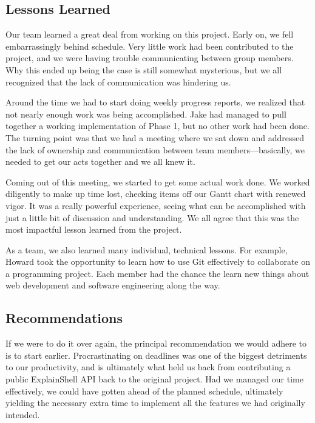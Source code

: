 \documentclass[11pt]{article}
\begin{document}
\subsection{Lessons Learned}

Our team learned a great deal from working on this project. Early on, we fell
embarrassingly behind schedule. Very little work had been contributed to the
project, and we were having trouble communicating between group members. Why
this ended up being the case is still somewhat mysterious, but we all recognized
that the lack of communication was hindering us.

Around the time we had to start doing weekly progress reports, we realized that
not nearly enough work was being accomplished. Jake had managed to pull together
a working implementation of Phase 1, but no other work had been done. The
turning point was that we had a meeting where we sat down and addressed the
lack of ownership and communication between team members---basically, we needed
to get our acts together and we all knew it.

Coming out of this meeting, we started to get some actual work done. We worked
diligently to make up time lost, checking items off our Gantt chart with renewed
vigor. It was a really powerful experience, seeing what can be accomplished with
just a little bit of discussion and understanding. We all agree that this was
the most impactful lesson learned from the project.

As a team, we also learned many individual, technical lessons. For example,
Howard took the opportunity to learn how to use Git effectively to
collaborate on a programming project. Each member had the chance the learn new
things about web development and software engineering along the way.

\subsection{Recommendations}

If we were to do it over again, the principal recommendation we would adhere to
is to start earlier. Procrastinating on deadlines was one of the biggest
detriments to our productivity, and is ultimately what held us back from
contributing a public ExplainShell API back to the original project. Had we
managed our time effectively, we could have gotten ahead of the planned
schedule, ultimately yielding the necessary extra time to implement all the
features we had originally intended.
\end{document}
